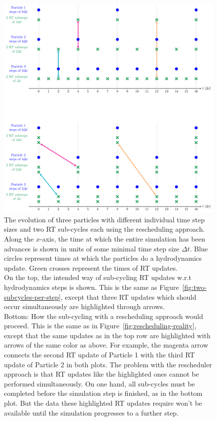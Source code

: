 \begin{figure}
 \centering
 \includegraphics[width=\textwidth]{figures/RHD/rescheduler-problem.pdf}%
 \caption{
The evolution of three particles with different individual time step sizes and two RT sub-cycles
each using the rescheduling approach. Along the $x$-axis, the time at which the entire simulation
has been advances is shown in units of some minimal time step size $\Delta t$. Blue circles
represent times at which the particles do a hydrodynamics update. Green crosses represent the times
of RT updates. \\
On the top, the intended way of sub-cycling RT updates w.r.t hydrodynamics steps is shown. This is
the same as Figure~\ref{fig:two-subcycles-per-step}, except that three RT updates which should
occur simultaneously are highlighted through arrows.\\
Bottom: How the sub-cycling with a rescheduling approach would proceed. This is the same as in
Figure~\ref{fig:rescheduling-reality}, except that the same updates as in the top row are
highlighted with arrows of the same color as above. For example, the magenta arrow connects the
second RT update of Particle 1 with the third RT update of Particle 2 in both plots. The problem
with the rescheduler approach is that RT updates like the highlighted ones cannot be performed
simultaneously. On one hand, all sub-cycles must be completed before the simulation step is
finished, as in the bottom plot. But the data these highlighted RT updates require won't be
available until the simulation progresses to a further step.
 }
 \label{fig:rescheduling-problem}
\end{figure}



